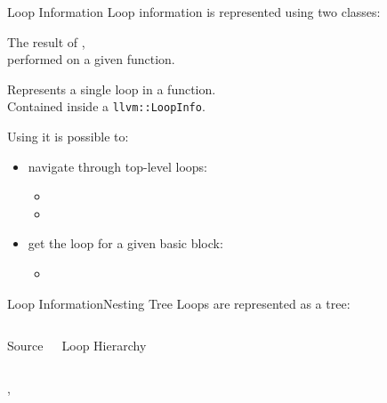 \begin{frame}{Loop Information}
Loop information is represented using two classes:

\begin{description}
\item[\texttt{llvm::LoopInfo}]
			The result of ,\\
			performed on a given function.
\item[\texttt{llvm::Loop}]
			Represents a single loop in a function.\\
			Contained inside a \texttt{llvm::LoopInfo}.
\end{description}

\vfill
Using  it is possible to:

\begin{itemize}
\item navigate through top-level loops:
\begin{itemize}
\item {}
\item {}
\end{itemize}
\item get the loop for a given basic block:
\begin{itemize}
\item {}
\end{itemize}
\end{itemize}
\end{frame}


\begin{frame}{Loop Information}{Nesting Tree}
Loops are represented as a \alert{tree}:\\
\begin{columns}
\begin{block}{Source\vphantom{Loop Nest}}
\cinput[\tt\fontsize{7.5pt}{7.5pt}\selectfont]{snippet/loop-nest.c}
\end{block}
\begin{block}{Loop Hierarchy}
\centering

\end{block}
\end{columns}
\vfill
\begin{description}
\item[children loops] ,
\item[parent loop] 
\end{description}
\end{frame}



